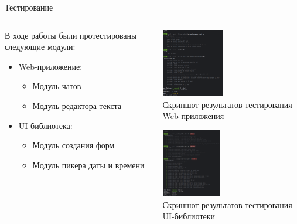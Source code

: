 \documentclass[aspectratio=169]{beamer}
\begin{document}
\begin{frame}{Тестирование}
\small
\justifying

\begin{columns}
  \begin{column}{0.45\textwidth}
    В ходе работы были протестированы следующие модули:
    \begin{itemize}
      \item Web-приложение:
      \begin{itemize}
        \item Модуль чатов
        \item Модуль редактора текста
      \end{itemize}
      \item UI-библиотека:
      \begin{itemize}
        \item Модуль создания форм
        \item Модуль пикера даты и времени
      \end{itemize}
    \end{itemize}
  \end{column}

  \begin{column}{0.55\textwidth}
    \centering
    \includegraphics[height=3cm]{static/ProjectTests.png} \\
    \scriptsize Скриншот результатов тестирования Web-приложения

    \vspace{1em} %

    \includegraphics[height=3cm]{static/LibTests.png} \\
    \scriptsize Скриншот результатов тестирования UI-библиотеки
  \end{column}
\end{columns}
\end{frame}
\end{document}
